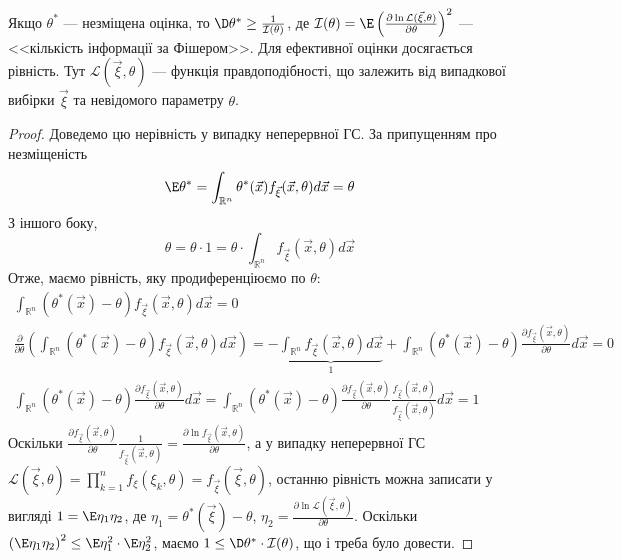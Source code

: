 \begin{theorem*}
    Якщо $\theta^*$ --- незміщена оцінка, то $\D\theta^* \geq \frac{1}{\mathcal{I}(\theta)}$, 
    де $\mathcal{I}(\theta) = \E\left( \frac{\partial \ln \mathcal{L}(\vec{\xi}, \theta)}{\partial \theta}\right)^2$ --- 
    {<<кількість інформації за Фішером>>}. Для ефективної оцінки досягається рівність. Тут
    $\mathcal{L}(\vec{\xi}, \theta)$ --- функція правдоподібності, що залежить від випадкової вибірки $\vec{\xi}$ та 
    невідомого параметру $\theta$. 
\end{theorem*}
\begin{proof}
    Доведемо цю нерівність у випадку неперервної ГС. 
    За припущенням про незміщеність $$\E\theta^* = \int_{\mathbb{R}^n}\theta^*(\vec{x}) f_{\vec{\xi}}(\vec{x}, \theta) d\vec{x} = \theta$$
    З іншого боку, $$ \theta = \theta \cdot 1 = \theta \cdot \int_{\mathbb{R}^n}f_{\vec{\xi}}(\vec{x}, \theta) d\vec{x}$$
    Отже, маємо рівність, яку продиференціюємо по $\theta$: 
    \begin{gather*}
        \int_{\mathbb{R}^n}(\theta^*(\vec{x}) - \theta) f_{\vec{\xi}}(\vec{x}, \theta) d\vec{x} = 0 \\
        \frac{\partial}{\partial  \theta}\left(\int_{\mathbb{R}^n}(\theta^*(\vec{x}) - \theta) f_{\vec{\xi}}(\vec{x}, \theta) d\vec{x}\right) =
         -\underbrace{\int_{\mathbb{R}^n}f_{\vec{\xi}}(\vec{x}, \theta) d\vec{x} }_1
         + \int_{\mathbb{R}^n}(\theta^*(\vec{x}) -\theta) \frac{\partial f_{\vec{\xi}}(\vec{x}, \theta)}{\partial \theta} d\vec{x} = 0 \\
         \int_{\mathbb{R}^n}(\theta^*(\vec{x}) -\theta) \frac{\partial f_{\vec{\xi}}(\vec{x}, \theta)}{\partial \theta} d\vec{x} = 
         \int_{\mathbb{R}^n}(\theta^*(\vec{x}) -\theta) \frac{\partial f_{\vec{\xi}}(\vec{x}, \theta)}{\partial \theta} \frac{f_{\vec{\xi}}(\vec{x}, \theta)}{f_{\vec{\xi}}(\vec{x}, \theta)} d\vec{x} = 1
    \end{gather*}
    Оскільки $\frac{\partial f_{\vec{\xi}}(\vec{x}, \theta)}{\partial \theta} \frac{1}{f_{\vec{\xi}}(\vec{x}, \theta)} = \frac{\partial\ln f_{\vec{\xi}}(\vec{x}, \theta)}{\partial \theta}$,
    а у випадку неперервної ГС $\mathcal{L}(\vec{\xi}, \theta) = \prod\limits_{k=1}^n f_{\xi}(\xi_k, \theta) = f_{\vec{\xi}}(\vec{\xi}, \theta)$, останню рівність можна записати у вигляді 
    $1 = \E\eta_1 \eta_2$, де $\eta_1 = \theta^*(\vec{\xi}) -\theta$, $\eta_2 = \frac{\partial\ln \mathcal{L}(\vec{\xi}, \theta)}{\partial \theta}$.
    Оскільки $\left( \E\eta_1 \eta_2 \right)^2 \leq \E\eta_1^2 \cdot \E\eta_2^2$, маємо $1 \leq \D\theta^* \cdot \mathcal{I}(\theta)$, що і треба було довести.
\end{proof}
